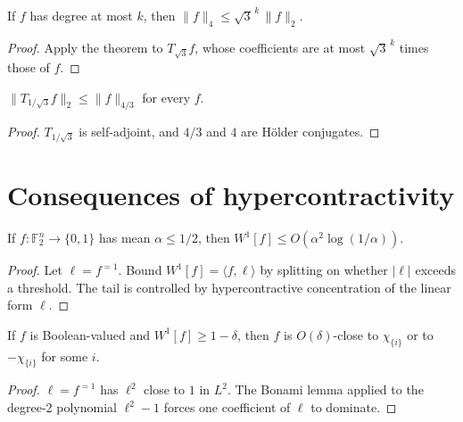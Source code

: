 \begin{corollary}
  \label{cor:analysis-bonami-lemma}
  \notready
  If $f$ has degree at most $k$, then
  $\lVert f \rVert_4 \le \sqrt{3}^{\,k}\, \lVert f \rVert_2$.
\end{corollary}
\begin{proof}
  Apply the theorem to $T_{\sqrt{3}} f$, whose coefficients are at most
  $\sqrt{3}^{\,k}$ times those of $f$.
\end{proof}

\begin{corollary}
  \label{cor:analysis-hypercontractivity-dual}
  \notready
  $\lVert T_{1/\sqrt{3}} f \rVert_2 \le \lVert f \rVert_{4/3}$ for every $f$.
\end{corollary}
\begin{proof}
  $T_{1/\sqrt{3}}$ is self-adjoint, and $4/3$ and $4$ are H\"older conjugates.
\end{proof}

\section{Consequences of hypercontractivity}

\begin{theorem}
  \label{thm:analysis-level1-inequality}
  If $f : \mathbb{F}_2^n \to \{0, 1\}$ has mean $\alpha \le 1/2$, then
  $W^1[f] \le O(\alpha^2 \log(1/\alpha))$.
\end{theorem}
\begin{proof}
  Let $\ell = f^{=1}$. Bound $W^1[f] = \langle f, \ell \rangle$ by splitting on
  whether $|\ell|$ exceeds a threshold. The tail is controlled by
  hypercontractive concentration of the linear form $\ell$.
\end{proof}

\begin{theorem}
  \label{thm:analysis-fkn}
  If $f$ is Boolean-valued and $W^1[f] \ge 1 - \delta$, then $f$ is
  $O(\delta)$-close to $\chi_{\{i\}}$ or to $-\chi_{\{i\}}$ for some $i$.
\end{theorem}
\begin{proof}
  $\ell = f^{=1}$ has $\ell^2$ close to $1$ in $L^2$. The Bonami lemma applied to
  the degree-2 polynomial $\ell^2 - 1$ forces one coefficient of $\ell$ to
  dominate.
\end{proof}

